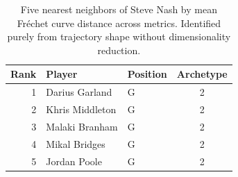 \begin{table}[htbp]
  \centering\small
  \begin{tabular}{rllc}
    \toprule
    Rank & Player & Position & Archetype \\
    \midrule
    1 & Darius Garland & G & 2 \\
    2 & Khris Middleton & G & 2 \\
    3 & Malaki Branham & G & 2 \\
    4 & Mikal Bridges & G & 2 \\
    5 & Jordan Poole & G & 2 \\
    \bottomrule
  \end{tabular}
  \caption{Five nearest neighbors of Steve Nash by mean Fr\'{e}chet curve distance across metrics. Identified purely from trajectory shape without dimensionality reduction.}
  \label{tab:Steve_Nash_frechet_curve_neighbors}
\end{table}

